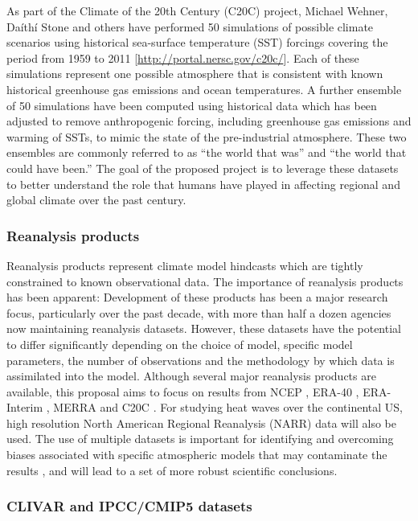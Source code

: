 \documentclass[11pt]{article}
\begin{document}
As part of the Climate of the 20th Century (C20C) project, Michael Wehner, Da\'ith\'i Stone and others have performed 50 simulations of possible climate scenarios using historical sea-surface temperature (SST) forcings covering the period from 1959 to 2011 [\url{http://portal.nersc.gov/c20c/}].  Each of these simulations represent one possible atmosphere that is consistent with known historical greenhouse gas emissions and ocean temperatures.  A further ensemble of 50 simulations have been computed using historical data which has been adjusted to remove anthropogenic forcing, including greenhouse gas emissions and warming of SSTs, to mimic the state of the pre-industrial atmosphere.  These two ensembles are commonly referred to as ``the world that was'' and ``the world that could have been.''  The goal of the proposed project is to leverage these datasets to better understand the role that humans have played in affecting regional and global climate over the past century.

\subsubsection{Reanalysis products}

Reanalysis products represent climate model hindcasts which are tightly constrained to known observational data.  The importance of reanalysis products has been apparent:  Development of these products has been a major research focus, particularly over the past decade, with more than half a dozen agencies now maintaining reanalysis datasets.  However, these datasets have the potential to differ significantly depending on the choice of model, specific model parameters, the number of observations and the methodology by which data is assimilated into the model.  Although several major reanalysis products are available, this proposal aims to focus on results from NCEP \citep{kalnay1996ncep}, ERA-40 \citep{uppala2005era}, ERA-Interim \citep{simmons2007era}, MERRA \citep{rienecker2011merra} and C20C \citep{compo2011twentieth}.  For studying heat waves over the continental US, high resolution North American Regional Reanalysis (NARR) data will also be used.  The use of multiple datasets is important for identifying and overcoming biases associated with specific atmospheric models that may contaminate the results \citep{jun2008spatial}, and will lead to a set of more robust scientific conclusions.

\subsubsection{CLIVAR and IPCC/CMIP5 datasets} \label{sec:CLIVAR-IPCC-CMIP5}
\end{document}
